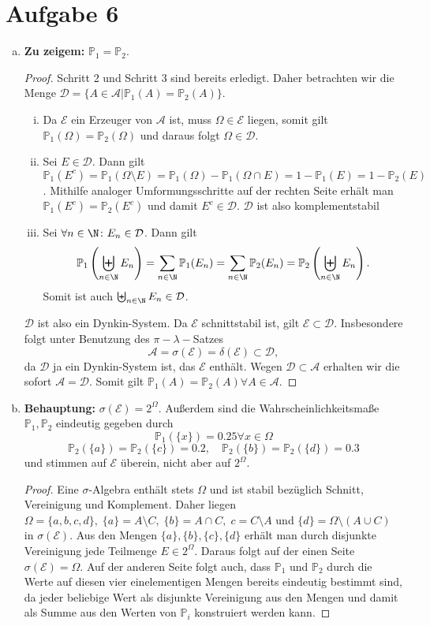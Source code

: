 \documentclass{article}
\newcommand{\A}{\mathcal{A}}
\newcommand{\D}{\mathcal{D}}
\newcommand{\E}{\mathcal{E}}
\newcommand{\IP}{\mathbb{P}}
\begin{document}
\def\headheight{25pt}
    \section*{Aufgabe 6}
    \begin{enumerate}[(a)]
        \item \textbf{Zu zeigem:} $\IP_1 = \IP_2$.
        \begin{proof}
        Schritt 2 und Schritt 3 sind bereits erledigt. Daher betrachten wir die Menge $\D = \{A\in \A| \IP_1(A) = \IP_2(A)\}$.
        \begin{enumerate}[(i)]
            \item Da $\E$ ein Erzeuger von $\A$ ist, muss $\Omega \in \E$ liegen, somit gilt $\IP_1(\Omega) = \IP_2(\Omega)$ und daraus folgt $\Omega \in \D$. 
            \item Sei $E \in \D$. Dann gilt $\IP_1(E^c) = \IP_1(\Omega \setminus E) = \IP_1(\Omega) - \IP_1(\Omega \cap E) = 1 - \IP_1(E) = 1 - \IP_2(E)$. Mithilfe analoger Umformungsschritte auf der rechten Seite erhält man $\IP_1(E^c) = \IP_2(E^c)$ und damit $E^c \in \D$. $\D$ ist also komplementstabil
            \item Sei $\forall n \in \N\colon E_n \in \D$. Dann gilt 
            \[
                \IP_1\left(\biguplus_{n\in \N} E_n\right) = \sum_{n \in \N} \IP_1(E_n) = \sum_{n \in \N} \IP_2(E_n) = \IP_2\left(\biguplus_{n\in \N} E_n\right).
                \]
                Somit ist auch $\biguplus_{n\in \N}E_n \in \D$.
            \end{enumerate}
            $\D$ ist also ein Dynkin-System. Da $\E$ schnittstabil ist, gilt $\E \subset \D$. Insbesondere folgt unter Benutzung des $\pi-\lambda-$Satzes \[\A = \sigma(\E) = \delta(\E) \subset \D,\] da $\D$ ja ein Dynkin-System ist, das $\E$ enthält. Wegen $\D \subset \A$ erhalten wir die sofort $\A = \D$. Somit gilt $\IP_1(A) = \IP_2(A) \forall A \in \A$.
        \end{proof}
        \item \textbf{Behauptung:} $\sigma(\E) = 2^\Omega$. Außerdem sind die Wahrscheinlichkeitsmaße $\IP_1,\IP_2$ eindeutig gegeben durch
        \[
            \IP_1(\{x\}) = 0.25 \forall x \in \Omega
        \]
        \[
            \IP_2(\{a\}) = \IP_2(\{c\}) = 0.2,\quad \IP_2(\{b\}) = \IP_2(\{d\}) = 0.3
        \] und stimmen auf $\E$ überein, nicht aber auf $2^\Omega$.
        \begin{proof}
            Eine $\sigma$-Algebra enthält stets $\Omega$ und ist stabil bezüglich Schnitt, Vereinigung und Komplement. Daher liegen $\Omega = \{a,b,c,d\},\; \{a\} = A \setminus C,\; \{b\} = A\cap C,\; c = C \setminus A$ und $\{d\} = \Omega \setminus (A \cup C)$  in $\sigma(\E)$. Aus den Mengen $\{a\}, \{b\},\{c\},\{d\}$ erhält man durch disjunkte Vereinigung jede Teilmenge $E \in 2^\Omega$. Daraus folgt auf der einen Seite $\sigma(\E) = \Omega$. Auf der anderen Seite folgt auch, dass $\IP_1$ und $\IP_2$ durch die Werte auf diesen vier einelementigen Mengen bereits eindeutig bestimmt sind, da jeder beliebige Wert als disjunkte Vereinigung aus den Mengen und damit als Summe aus den Werten von $\IP_i$ konstruiert werden kann.

\end{proof}
\end{enumerate}
\end{document}

